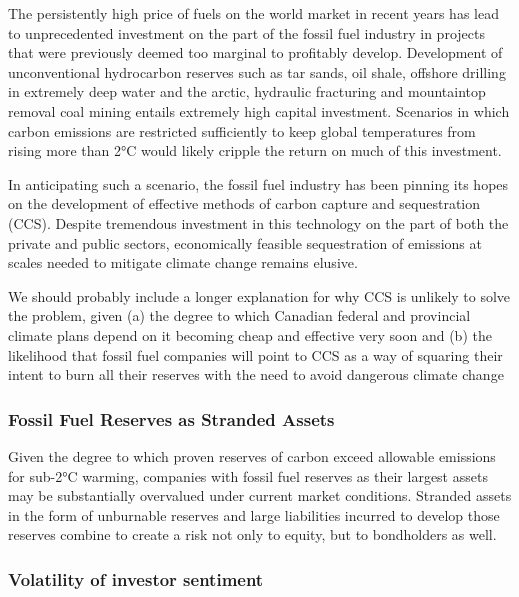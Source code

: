 The persistently high price of fuels on the world market in recent years has lead to unprecedented investment on the part of the fossil fuel industry in projects that were previously deemed too marginal to profitably develop. 
Development of unconventional hydrocarbon reserves such as tar sands, oil shale, offshore drilling in extremely deep water and the arctic, hydraulic fracturing and mountaintop removal coal mining entails extremely high capital investment. 
Scenarios in which carbon emissions are restricted sufficiently to keep global temperatures from rising more than 2°C would likely cripple the return on much of this investment.

In anticipating such a scenario, the fossil fuel industry has been pinning its hopes on the development of effective methods of carbon capture and sequestration (CCS). 
Despite tremendous investment in this technology on the part of both the private and public sectors, economically feasible sequestration of emissions at scales needed to mitigate climate change remains elusive.

\begin{vcom}
	We should probably include a longer explanation for why CCS is unlikely to solve the problem, given (a) the degree to which Canadian federal and provincial climate plans depend on it becoming cheap and effective very soon and (b) the likelihood that fossil fuel companies will point to CCS as a way of squaring their intent to burn all their reserves with the need to avoid dangerous climate change
\end{vcom}



\subsubsection {Fossil Fuel Reserves as Stranded Assets} 



Given the degree to which proven reserves of carbon exceed allowable emissions for sub-2°C warming, companies with fossil fuel reserves as their largest assets may be substantially overvalued under current market conditions. 
Stranded assets in the form of unburnable reserves and large liabilities incurred to develop those reserves combine to create a risk not only to equity, but to bondholders as well.



\subsubsection {Volatility of investor sentiment}



